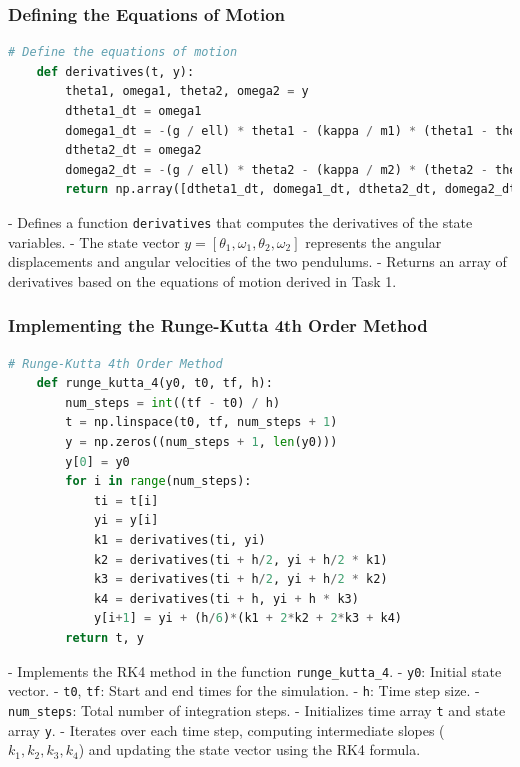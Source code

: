 \documentclass[12pt]{report} %
\begin{document}
    \subsubsection{Defining the Equations of Motion}
    
    \begin{lstlisting}[language=Python, caption={Defining the Equations of Motion}, label={lst:equations_of_motion}]
    # Define the equations of motion
    def derivatives(t, y):
        theta1, omega1, theta2, omega2 = y
        dtheta1_dt = omega1
        domega1_dt = -(g / ell) * theta1 - (kappa / m1) * (theta1 - theta2)
        dtheta2_dt = omega2
        domega2_dt = -(g / ell) * theta2 - (kappa / m2) * (theta2 - theta1)
        return np.array([dtheta1_dt, domega1_dt, dtheta2_dt, domega2_dt])
    \end{lstlisting}
    
    - Defines a function \texttt{derivatives} that computes the derivatives of the state variables.
    - The state vector \( y = [\theta_1, \omega_1, \theta_2, \omega_2] \) represents the angular displacements and angular velocities of the two pendulums.
    - Returns an array of derivatives based on the equations of motion derived in Task 1.
    
    \subsubsection{Implementing the Runge-Kutta 4th Order Method}
    
    \begin{lstlisting}[language=Python, caption={Runge-Kutta 4th Order Method Implementation}, label={lst:rk4_implementation}]
    # Runge-Kutta 4th Order Method
    def runge_kutta_4(y0, t0, tf, h):
        num_steps = int((tf - t0) / h)
        t = np.linspace(t0, tf, num_steps + 1)
        y = np.zeros((num_steps + 1, len(y0)))
        y[0] = y0
        for i in range(num_steps):
            ti = t[i]
            yi = y[i]
            k1 = derivatives(ti, yi)
            k2 = derivatives(ti + h/2, yi + h/2 * k1)
            k3 = derivatives(ti + h/2, yi + h/2 * k2)
            k4 = derivatives(ti + h, yi + h * k3)
            y[i+1] = yi + (h/6)*(k1 + 2*k2 + 2*k3 + k4)
        return t, y
    \end{lstlisting}
    
    - Implements the RK4 method in the function \texttt{runge\_kutta\_4}.
    - \texttt{y0}: Initial state vector.
    - \texttt{t0}, \texttt{tf}: Start and end times for the simulation.
    - \texttt{h}: Time step size.
    - \texttt{num\_steps}: Total number of integration steps.
    - Initializes time array \texttt{t} and state array \texttt{y}.
    - Iterates over each time step, computing intermediate slopes (\( k_1, k_2, k_3, k_4 \)) and updating the state vector using the RK4 formula.
    
\end{document}
